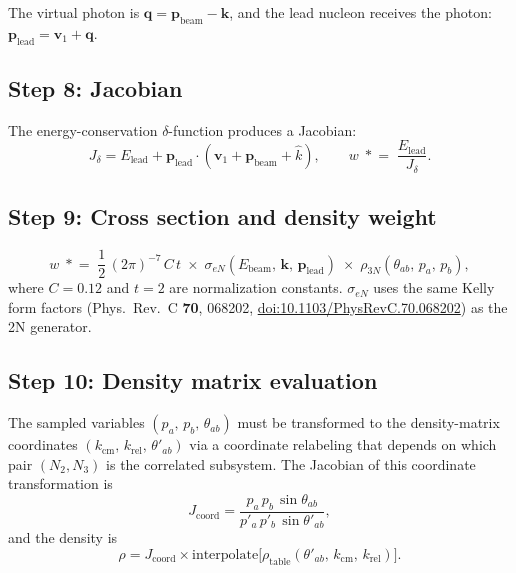 \documentclass[11pt,a4paper]{article}
\newcommand{\vect}[1]{\bm{#1}}
\begin{document}
The virtual photon is $\vect{q} = \vect{p}_{\text{beam}} - \vect{k}$,
and the lead nucleon receives the photon:
$\vect{p}_{\text{lead}} = \vect{v}_{1} + \vect{q}$.

\subsection{Step 8: Jacobian}

The energy-conservation $\delta$-function produces a Jacobian:
\begin{equation}
  J_{\delta} = E_{\text{lead}} + \vect{p}_{\text{lead}} \cdot
               (\vect{v}_{1} + \vect{p}_{\text{beam}} + \hat{k}),
  \qquad
  w \;\mathrel{*}=\; \frac{E_{\text{lead}}}{J_{\delta}}.
\end{equation}

\subsection{Step 9: Cross section and density weight}

\begin{equation}
  w \;\mathrel{*}=\; \frac{1}{2}\,(2\pi)^{-7}\,C\,t
    \;\times\; \sigma_{eN}(E_{\text{beam}},\,\vect{k},\,\vect{p}_{\text{lead}})
    \;\times\; \rho_{3N}(\theta_{ab},\,p_{a},\,p_{b}),
\end{equation}
where $C = 0.12$ and $t = 2$ are normalization constants.
$\sigma_{eN}$ uses the same Kelly form factors (Phys.\ Rev.\ C \textbf{70}, 068202,
\href{https://doi.org/10.1103/PhysRevC.70.068202}{doi:10.1103/PhysRevC.70.068202}) as the 2N generator.

\subsection{Step 10: Density matrix evaluation}

The sampled variables $(p_{a},\,p_{b},\,\theta_{ab})$ must be
transformed to the density-matrix coordinates
$(k_{\text{cm}},\,k_{\text{rel}},\,\theta'_{ab})$ via a coordinate
relabeling that depends on which pair $(N_{2},N_{3})$ is the
correlated subsystem.  The Jacobian of this coordinate transformation is
\begin{equation}
  J_{\text{coord}}
  = \frac{p_{a}\,p_{b}\,\sin\theta_{ab}}
         {p'_{a}\,p'_{b}\,\sin\theta'_{ab}},
\end{equation}
and the density is
\begin{equation}
  \rho = J_{\text{coord}} \times
         \text{interpolate}\bigl[\rho_{\text{table}}(\theta'_{ab},\,k_{\text{cm}},\,k_{\text{rel}})\bigr].
\end{equation}
\end{document}
